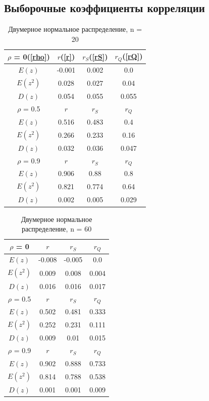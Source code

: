 \documentclass[../body.tex]{subfiles}
\begin{document}
	
	\subsection{Выборочные коэффициенты корреляции}
	
	\begin{table}[H]
		\centering
		\begin{tabular}{| c | c | c | c |}
			\hline  \hline
			$\rho$ = 0(\ref{rho})   & $r$(\ref{r})    & $r_S$(\ref{rS}) & $r_Q$(\ref{rQ}) \\ \hline
			$E(z)$       & -0.001 & 0.002 & 0.0   \\ \hline
			$E(z^2)$     & 0.028  & 0.027 & 0.04  \\ \hline
			$D(z)$       & 0.054  & 0.055 & 0.055 \\ \hline
			$\rho$ = 0.5 & $r$    & $r_S$ & $r_Q$ \\ \hline
			$E(z)$       & 0.516  & 0.483 & 0.4   \\ \hline
			$E(z^2)$     & 0.266  & 0.233 & 0.16  \\ \hline
			$D(z)$       & 0.032  & 0.036 & 0.047 \\ \hline
			$\rho$ = 0.9 & $r$    & $r_S$ & $r_Q$ \\ \hline
			$E(z)$       & 0.906  & 0.88  & 0.8   \\ \hline
			$E(z^2)$     & 0.821  & 0.774 & 0.64  \\ \hline
			$D(z)$       & 0.002  & 0.005 & 0.029 \\
			\hline \hline
		\end{tabular}
		\caption{Двумерное нормальное распределение, n = 20}
		\label{tab:n=20}
	\end{table}

	\begin{table}[H]
		\centering
		\begin{tabular}{| c | c | c | c |}
			\hline  \hline
			$\rho$ = 0   & $r$    & $r_S$  & $r_Q$ \\ \hline
			$E(z)$       & -0.008 & -0.005 & 0.0   \\ \hline
			$E(z^2)$     & 0.009  & 0.008  & 0.004 \\ \hline
			$D(z)$       & 0.016  & 0.016  & 0.017 \\ \hline
			$\rho$ = 0.5 & $r$    & $r_S$  & $r_Q$ \\ \hline
			$E(z)$       & 0.502  & 0.481  & 0.333 \\ \hline
			$E(z^2)$     & 0.252  & 0.231  & 0.111 \\ \hline
			$D(z)$       & 0.009  & 0.01   & 0.015 \\ \hline
			$\rho$ = 0.9 & $r$    & $r_S$  & $r_Q$ \\ \hline
			$E(z)$       & 0.902  & 0.888  & 0.733 \\ \hline
			$E(z^2)$     & 0.814  & 0.788  & 0.538 \\ \hline
			$D(z)$       & 0.001  & 0.001  & 0.009 \\
			\hline \hline
		\end{tabular}
	\caption{Двумерное нормальное распределение, n = 60}
	\label{tab:n=60}
	\end{table}
\end{document}
